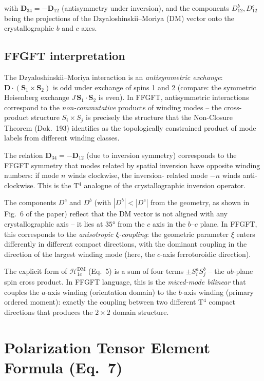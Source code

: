 \noindent with $\mathbf{D}_{34} = -\mathbf{D}_{12}$ (antisymmetry under inversion),
and the components $D_{12}^b, D_{12}^c$ being the projections of the
Dzyaloshinskii--Moriya (DM) vector onto the crystallographic $b$ and $c$ axes.

\subsection*{FFGFT interpretation}

The Dzyaloshinskii--Moriya interaction is an \emph{antisymmetric exchange}:
$\mathbf{D}\cdot(\mathbf{S}_1\times\mathbf{S}_2)$ is odd under exchange of
spins 1 and 2 (compare: the symmetric Heisenberg exchange
$J\,\mathbf{S}_1\cdot\mathbf{S}_2$ is even). In FFGFT, antisymmetric
interactions correspond to the \emph{non-commutative} products of winding
modes -- the cross-product structure $S_i\times S_j$ is precisely the
structure that the Non-Closure Theorem (Dok.~193) identifies as the
topologically constrained product of mode labels from different winding
classes.

The relation $\mathbf{D}_{34} = -\mathbf{D}_{12}$ (due to inversion symmetry)
corresponds to the FFGFT symmetry that modes related by spatial inversion
have opposite winding numbers: if mode $n$ winds clockwise, the inversion-
related mode $-n$ winds anti-clockwise. This is the T$^4$ analogue of the
crystallographic inversion operator.

The components $D^c$ and $D^b$ (with $|D^b| < |D^c|$ from the geometry,
as shown in Fig.~6 of the paper) reflect that the DM vector is not
aligned with any crystallographic axis -- it lies at $35°$ from the $c$
axis in the $b$--$c$ plane. In FFGFT, this corresponds to the
\emph{anisotropic ξ-coupling}: the geometric parameter $\xi$ enters
differently in different compact directions, with the dominant coupling
in the direction of the largest winding mode (here, the $c$-axis
ferrotoroidic direction).

The explicit form of $\mathcal{H}_{1c}^{\mathrm{DM}}$ (Eq.~5) is a
sum of four terms $\pm S_i^a S_j^b$ -- the $ab$-plane spin cross product.
In FFGFT language, this is the \emph{mixed-mode bilinear} that couples
the $a$-axis winding (orientation domain) to the $b$-axis winding
(primary ordered moment): exactly the coupling between two different T$^4$
compact directions that produces the $2\times2$ domain structure.

\section{Polarization Tensor Element Formula (Eq.~7)}

